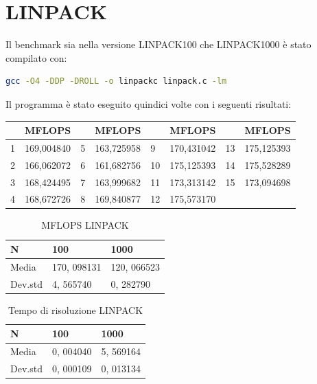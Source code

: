\documentclass[12pt, a4paper]{report}
\begin{document}
\section{LINPACK}
Il benchmark sia nella versione LINPACK100 che LINPACK1000 è stato compilato con:

\begin{lstlisting}[language=sh, caption = {compilazione LINPACK}, captionpos = b]
gcc -O4 -DDP -DROLL -o linpackc linpack.c -lm
\end{lstlisting}


Il programma è stato eseguito quindici volte con i seguenti risultati:

\begin{table}[ht]
\begin{tabular}{|l|l|l|l|l|l|l|l|}
\hline
  & MFLOPS     &   & MFLOPS     &    & MFLOPS     &    & MFLOPS     \\ \hline
1 & 169,004840 & 5 & 163,725958 & 9 & 170,431042 & 13 & 175,125393 \\ \hline
2 & 166,062072 & 6 & 161,682756 & 10 & 175,125393 & 14 & 175,528289 \\ \hline
3 & 168,424495 & 7 & 163,999682 & 11 & 173,313142 & 15 & 173,094698 \\ \hline
4 & 168,672726 & 8 & 169,840877 & 12 & 175,573170 &  &  \\ \hline
\end{tabular}
\end{table}

\begin{table}[ht]
\centering
\begin{tabular}{|l|l|l|}
\hline
N & 100 & 1000 \\ \hline
Media & 170, 098131 & 120, 066523 \\ \hline
Dev.std & 4, 565740 & 0, 282790 \\ \hline
\end{tabular}
\caption{MFLOPS LINPACK}
\end{table}

\begin{table}[ht]
\centering
\begin{tabular}{|l|l|l|}
\hline
N & 100 & 1000 \\ \hline
Media & 0, 004040 & 5, 569164 \\ \hline
Dev.std & 0, 000109 & 0, 013134 \\ \hline
\end{tabular}
\caption{Tempo di risoluzione LINPACK}
\end{table}
\end{document}
